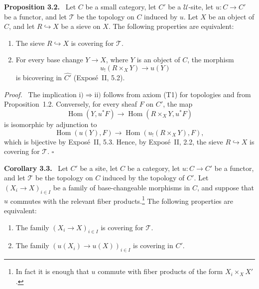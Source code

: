 \documentclass[11pt]{article}
\newcommand{\U}{\mathcal{U}}
\newcommand{\Hom}{\operatorname{Hom}}
\newcommand{\qedtext}{\hfill\(\square\)}
\newenvironment{statement}[1]{\par\medskip\noindent\textbf{#1.}\ }{\par\medskip}
\newenvironment{prooftext}{\par\noindent\emph{Proof.}\ }{\par\medskip}
\begin{document}
\begin{statement}{Proposition 3.2}
Let \(C\) be a small category, let \(C'\) be a \(\U\)-site, let \(u:C\to C'\) be a functor, and let \(\mathcal T\) be the topology on \(C\) induced by \(u\). Let \(X\) be an object of \(C\), and let \(R\hookrightarrow X\) be a sieve on \(X\). The following properties are equivalent:
\begin{enumerate}[label=\roman*)]
\item The sieve \(R\hookrightarrow X\) is covering for \(\mathcal T\).
\item For every base change \(Y\to X\), where \(Y\) is an object of \(C\), the morphism
\[
u_!(R\times_XY)\longrightarrow u(Y)
\]
is bicovering in \(\widehat{C'}\) (Expos\'e~II, 5.2).
\end{enumerate}
\end{statement}

\begin{prooftext}
The implication \(\mathrm{i})\Rightarrow\mathrm{ii})\) follows from axiom (T1) for topologies and from Proposition~1.2. Conversely, for every sheaf \(F\) on \(C'\), the map
\[
\Hom(Y,u^*F)\longrightarrow\Hom(R\times_XY,u^*F)
\]
is isomorphic by adjunction to
\[
\Hom(u(Y),F)\longrightarrow\Hom(u_!(R\times_XY),F),
\]
which is bijective by Expos\'e~II, 5.3. Hence, by Expos\'e~II, 2.2, the sieve \(R\hookrightarrow X\) is covering for \(\mathcal T\). \qedtext
\end{prooftext}

\begin{statement}{Corollary 3.3}
Let \(C'\) be a site, let \(C\) be a category, let \(u:C\to C'\) be a functor, and let \(\mathcal T\) be the topology on \(C\) induced by the topology of \(C'\). Let \((X_i\to X)_{i\in I}\) be a family of base-changeable morphisms in \(C\), and suppose that \(u\) commutes with the relevant fiber products.\footnote{In fact it is enough that \(u\) commute with fiber products of the form \(X_i\times_XX'\).} The following properties are equivalent:
\begin{enumerate}[label=\roman*)]
\item The family \((X_i\to X)_{i\in I}\) is covering for \(\mathcal T\).
\item The family \((u(X_i)\to u(X))_{i\in I}\) is covering in \(C'\).
\end{enumerate}
\end{statement}
\end{document}
